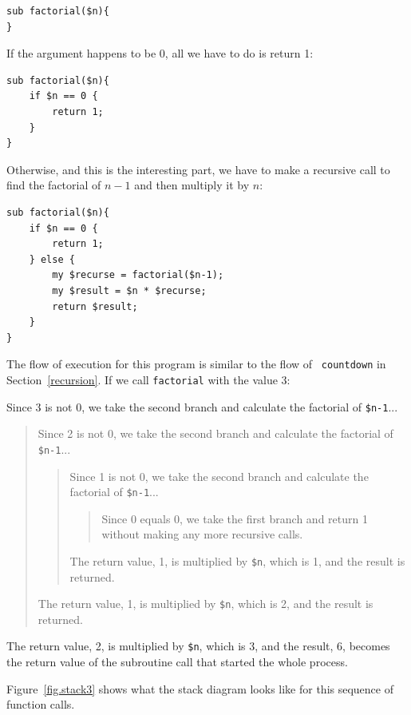 \begin{verbatim}
sub factorial($n){
}
\end{verbatim}
%
If the argument happens to be 0, all we have to do is return 1:

\begin{verbatim}
sub factorial($n){
    if $n == 0 {
        return 1;
    }
}   
\end{verbatim}
%
Otherwise, and this is the interesting part, we have to make a
recursive call to find the factorial of $n-1$ and then 
multiply it by $n$:

\begin{verbatim}
sub factorial($n){
    if $n == 0 {
        return 1;
    } else {
        my $recurse = factorial($n-1);
        my $result = $n * $recurse;
        return $result;
    }
}
\end{verbatim}
%
The flow of execution for this program is similar to the flow of {\tt
countdown} in Section~\ref{recursion}.  If we call {\tt factorial}
with the value 3:

Since 3 is not 0, we take the second branch and calculate the factorial
of {\tt \$n-1}...

\begin{quote}
Since 2 is not 0, we take the second branch and calculate the factorial of
{\tt \$n-1}...


  \begin{quote}
  Since 1 is not 0, we take the second branch and calculate the factorial
  of {\tt \$n-1}...


    \begin{quote}
    Since 0 equals 0, we take the first branch and return 1
    without making any more recursive calls.
    \end{quote}


  The return value, 1, is multiplied by \verb'$n', which is 1, and the
  result is returned.
  \end{quote}


The return value, 1, is multiplied by \verb'$n', which is 2, and the
result is returned.
\end{quote}


The return value, 2, is multiplied by \verb'$n', which is 3, and 
the result, 6, becomes the return value of the subroutine call 
that started the whole process.

Figure~\ref{fig.stack3} shows what the stack diagram looks like for
this sequence of function calls.

